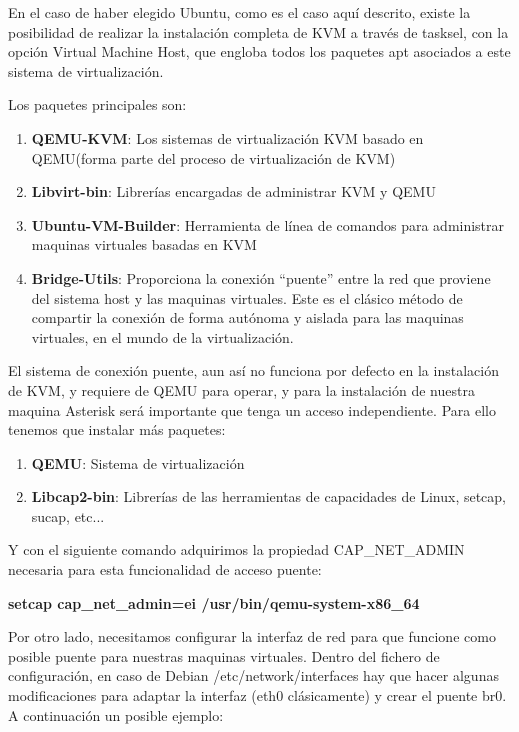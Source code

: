 En el caso de haber elegido Ubuntu, como es el caso aquí descrito, existe la posibilidad de realizar la instalación completa de KVM a través de tasksel, con la opción Virtual Machine Host, que engloba todos los paquetes apt asociados a este sistema de virtualización.

Los paquetes principales son:

\begin{enumerate}
\item \textbf{QEMU-KVM}: Los sistemas de virtualización KVM basado en QEMU(forma parte del proceso de virtualización de KVM)
\item \textbf{Libvirt-bin}: Librerías encargadas de administrar KVM y QEMU
\item \textbf{Ubuntu-VM-Builder}: Herramienta de línea de comandos para administrar maquinas virtuales basadas en KVM
\item \textbf{Bridge-Utils}: Proporciona la conexión “puente” entre la red que proviene del sistema host y las maquinas virtuales. Este es el clásico método de compartir la conexión de forma autónoma y aislada para las maquinas virtuales, en el mundo de la virtualización.
\end{enumerate}

El sistema de conexión puente, aun así no funciona por defecto en la instalación de KVM, y requiere de QEMU para operar, y para la instalación de nuestra maquina Asterisk será importante que tenga un acceso independiente. Para ello tenemos que instalar más paquetes:

\begin{enumerate}
\item \textbf{QEMU}: Sistema de virtualización
\item \textbf{Libcap2-bin}: Librerías de las herramientas de capacidades de Linux, setcap, sucap, etc...
\end{enumerate}

Y con el siguiente comando adquirimos la propiedad CAP\_NET\_ADMIN necesaria para esta funcionalidad de acceso puente:

\textbf{setcap cap\_net\_admin=ei /usr/bin/qemu-system-x86\_64}

Por otro lado, necesitamos configurar la interfaz de red para que funcione como posible puente para nuestras maquinas virtuales. Dentro del fichero de configuración, en caso de Debian /etc/network/interfaces hay que hacer algunas modificaciones para adaptar la interfaz (eth0 clásicamente) y crear el puente br0. A continuación un posible ejemplo:

